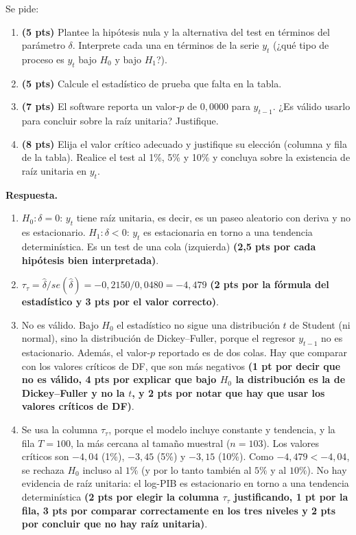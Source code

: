 \documentclass[12pt,letterpaper]{article}
\newcommand{\sol}{\color{blue}}
\begin{document}
\begin{enumerate}
\noindent Se pide:
\begin{enumerate}
  \item[(a)] \textbf{(5 pts)} Plantee la hipótesis nula y la alternativa del test en términos del
  parámetro $\delta$. Interprete cada una en términos de la serie $y_t$ (¿qué tipo de proceso
  es $y_t$ bajo $H_0$ y bajo $H_1$?).
  \item[(b)] \textbf{(5 pts)} Calcule el estadístico de prueba que falta en la tabla.
  \item[(c)] \textbf{(7 pts)} El software reporta un valor-$p$ de $0{,}0000$ para $y_{t-1}$. ¿Es
  válido usarlo para concluir sobre la raíz unitaria? Justifique.
  \item[(d)] \textbf{(8 pts)} Elija el valor crítico adecuado y justifique su elección (columna y
  fila de la tabla). Realice el test al 1\%, 5\% y 10\% y concluya sobre la existencia de raíz unitaria en $y_t$.
\end{enumerate}

{\sol
\textbf{Respuesta.}
\begin{enumerate}
  \item[(a)] $H_0: \delta = 0$: $y_t$ tiene raíz unitaria, es decir, es un paseo aleatorio con
  deriva y no es estacionario. $H_1: \delta < 0$: $y_t$ es estacionaria en torno a una tendencia
  determinística. Es un test de una cola (izquierda) \textbf{(2,5 pts por cada hipótesis bien interpretada)}.
  \item[(b)] $\tau_\tau = \hat\delta / se(\hat\delta) = -0{,}2150/0{,}0480 = -4{,}479$ \textbf{(2 pts por la fórmula del estadístico y 3 pts por el valor correcto)}.
  \item[(c)] No es válido. Bajo $H_0$ el estadístico no sigue una distribución $t$ de Student
  (ni normal), sino la distribución de Dickey--Fuller, porque el regresor $y_{t-1}$ no es
  estacionario. Además, el valor-$p$ reportado es de dos colas. Hay que comparar con los
  valores críticos de DF, que son más negativos \textbf{(1 pt por decir que no es válido, 4 pts por explicar que bajo $H_0$ la distribución es la de Dickey--Fuller y no la $t$, y 2 pts por notar que hay que usar los valores críticos de DF)}.
  \item[(d)] Se usa la columna $\tau_\tau$, porque el modelo incluye constante y tendencia, y la
  fila $T=100$, la más cercana al tamaño muestral ($n=103$). Los valores críticos son $-4{,}04$ (1\%), $-3{,}45$ (5\%) y $-3{,}15$ (10\%). Como
  $-4{,}479 < -4{,}04$, se rechaza $H_0$ incluso al $1\%$ (y por lo tanto también al $5\%$ y al $10\%$). No hay evidencia de raíz unitaria: el
  log-PIB es estacionario en torno a una tendencia determinística \textbf{(2 pts por elegir la columna $\tau_\tau$ justificando, 1 pt por la fila, 3 pts por comparar correctamente en los tres niveles y 2 pts por concluir que no hay raíz unitaria)}.
\end{enumerate}}


\end{enumerate}
\end{document}
